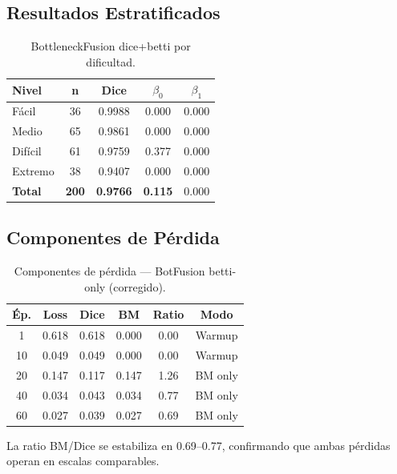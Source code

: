 \documentclass[10pt,twocolumn]{article}
\begin{document}
\subsection{Resultados Estratificados}

\begin{table}[H]
\centering
\caption{BottleneckFusion dice+betti por dificultad.}
\label{tab:stratified}
\begin{tabular}{lcccc}
\toprule
\textbf{Nivel} & \textbf{n} & \textbf{Dice} & $\beta_0$ & $\beta_1$ \\
\midrule
Fácil & 36 & 0.9988 & 0.000 & 0.000 \\
Medio & 65 & 0.9861 & 0.000 & 0.000 \\
Difícil & 61 & 0.9759 & 0.377 & 0.000 \\
Extremo & 38 & 0.9407 & 0.000 & 0.000 \\
\midrule
\textbf{Total} & \textbf{200} & \textbf{0.9766} & \textbf{0.115} & $\mathbf{0.000}$ \\
\bottomrule
\end{tabular}
\end{table}

\subsection{Componentes de Pérdida}

\begin{table}[H]
\centering
\caption{Componentes de pérdida — BotFusion betti-only (corregido).}
\label{tab:components}
\begin{tabular}{cccccc}
\toprule
\textbf{Ép.} & \textbf{Loss} & \textbf{Dice} & \textbf{BM} & \textbf{Ratio} & \textbf{Modo} \\
\midrule
1 & 0.618 & 0.618 & 0.000 & 0.00 & Warmup \\
10 & 0.049 & 0.049 & 0.000 & 0.00 & Warmup \\
20 & 0.147 & 0.117 & 0.147 & 1.26 & BM only \\
40 & 0.034 & 0.043 & 0.034 & 0.77 & BM only \\
60 & 0.027 & 0.039 & 0.027 & 0.69 & BM only \\
\bottomrule
\end{tabular}
\end{table}

La ratio BM/Dice se estabiliza en 0.69--0.77, confirmando que ambas pérdidas operan en escalas comparables.

\end{document}
